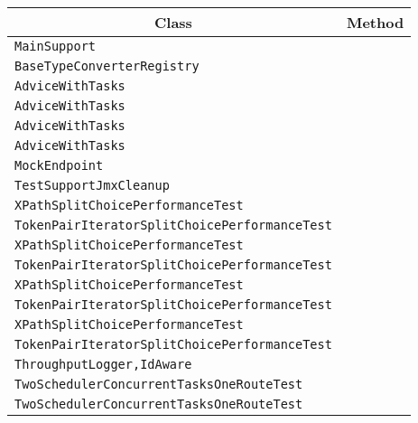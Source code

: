 \begin{center}
\begin{tabular}{ll}\toprule
\multicolumn{1}{c}{Class}&\multicolumn{1}{c}{Method}\\\midrule
\lstinline/MainSupport/&\raisebox{0pt}{\lstinline/waitUntilCompleted()/}\\
\lstinline/BaseTypeConverterRegistry/&\raisebox{0pt}{\lstinline/doStop()/}\\
\lstinline/AdviceWithTasks/&\raisebox{0pt}{\lstinline/task()/}\\
\lstinline/AdviceWithTasks/&\raisebox{0pt}{\lstinline/task()/}\\
\lstinline/AdviceWithTasks/&\raisebox{0pt}{\lstinline/task()/}\\
\lstinline/AdviceWithTasks/&\raisebox{0pt}{\lstinline/task()/}\\
\lstinline/MockEndpoint/&\raisebox{0pt}{\lstinline/assertIsSatisfied(long)/}\\
\lstinline/TestSupportJmxCleanup/&\raisebox{0pt}{\lstinline/traceMBeans(String)/}\\
\lstinline/XPathSplitChoicePerformanceTest/&\raisebox{0pt}{\lstinline/process(Exchange)/}\\
\lstinline/TokenPairIteratorSplitChoicePerformanceTest/&\raisebox{0pt}{\lstinline/process(Exchange)/}\\
\lstinline/XPathSplitChoicePerformanceTest/&\raisebox{0pt}{\lstinline/process(Exchange)/}\\
\lstinline/TokenPairIteratorSplitChoicePerformanceTest/&\raisebox{0pt}{\lstinline/process(Exchange)/}\\
\lstinline/XPathSplitChoicePerformanceTest/&\raisebox{0pt}{\lstinline/process(Exchange)/}\\
\lstinline/TokenPairIteratorSplitChoicePerformanceTest/&\raisebox{0pt}{\lstinline/process(Exchange)/}\\
\lstinline/XPathSplitChoicePerformanceTest/&\raisebox{0pt}{\lstinline/process(Exchange)/}\\
\lstinline/TokenPairIteratorSplitChoicePerformanceTest/&\raisebox{0pt}{\lstinline/process(Exchange)/}\\
\lstinline/ThroughputLogger,IdAware/&\raisebox{0pt}{\lstinline/booleanprocess(Exchange,AsyncCallback)/}\\
\lstinline/TwoSchedulerConcurrentTasksOneRouteTest/&\raisebox{0pt}{\lstinline/process(Exchange)/}\\
\lstinline/TwoSchedulerConcurrentTasksOneRouteTest/&\raisebox{0pt}{\lstinline/process(Exchange)/}\\

\end{tabular}
\end{center}
